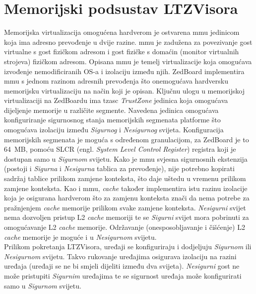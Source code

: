 \documentclass[times, utf8, diplomski, numeric]{fer}
\begin{document}
\section{Memorijski podsustav LTZVisora}
Memorijska virtualizacija omogućena hardverom je ostvarena \gls{mmu} jedinicom koja ima adresno prevođenje u dvije razine. \gls{mmu} je
zadužena za povezivanje gost virtualne s gost fizičkom adresom i gost fizičke s domaćin (monitor virtualnih strojeva) fizičkom
adresom. Opisana \gls{mmu} je temelj virtualizacije koja omogućava izvođenje nemodificiranih OS-a i izolaciju između njih. ZedBoard
implementira \gls{mmu} s jednom razinom adresnih prevođenja što onemogućava hardversku memorijsku virtualizaciju na način koji je
opisan. Ključnu ulogu u memorijskoj virtualizaciji na ZedBoardu ima \gls{tzasc} \textit{TrustZone} jedinica koja omogućava dijeljenje
memorije u različite segmente. Navedena jedinica omogućava konfiguriranje sigurnosnog stanja memorijskih segmenata platforme
što omogućava izolaciju između \textit{Sigurnog} i \textit{Nesigurnog} svijeta. Konfiguracija memorijskih segmenata je moguća s određenom
granulacijom, za ZedBoard je to 64~MB, pomoću SLCR (engl. \textit{System Level Control Register}) registra koji je dostupan
samo u \textit{Sigurnom} svijetu. Kako je \gls{mmu} svjesna sigurnosnih ekstenzija (postoji i \textit{Sigurna} i \textit{Nesigurna} tablica za prevođenje),
nije potrebno kopirati sadržaj tablice prilikom zamjene konteksta, što daje uštedu u vremenu prilikom zamjene konteksta.
Kao i \gls{mmu}, \textit{cache} također implementira istu razinu izolacije koja je osigurana hardverom što za zamjenu konteksta
znači da nema potrebe za pražnjenjem \textit{cache} memorije prilikom svake zamjene konteksta. \textit{Nesigurni} svijet nema dozvoljen
pristup L2 \textit{cache} memoriji te se \textit{Sigurni} svijet mora pobrinuti za omogućavanje L2 \textit{cache} memorije. Održavanje
(onesposobljavanje i čišćenje) L2 \textit{cache} memorije je moguće i u \textit{Nesigurnom} svijetu. \\
Prilikom pokretanja LTZVisora, uređaji se konfiguriraju i dodjeljuju \textit{Sigurnom} ili \textit{Nesigurnom} svijetu. Takvo rukovanje uređajima
osigurava izolaciju na razini uređaja (uređaji se ne bi smjeli dijeliti između dva svijeta). \textit{Nesigurni} gost ne može pristupiti
\textit{Sigurnim} uređajima te se sigurnost uređaja može konfigurirati samo u \textit{Sigurnom} svijetu.
\end{document}
